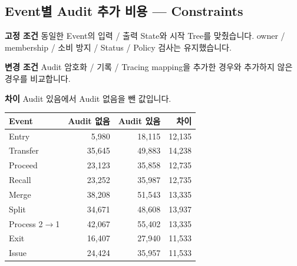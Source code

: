 \documentclass[11pt,a4paper]{article}
\begin{document}
\par\noindent\begin{minipage}{\linewidth}
\subsection*{Event별 Audit 추가 비용 — Constraints}
\textbf{고정 조건}\newline
동일한 Event의 입력 / 출력 State와 시작 Tree를 맞췄습니다.\newline
owner / membership / 소비 방지 / Status / Policy 검사는 유지했습니다.\par\smallskip
\textbf{변경 조건}\newline
Audit 암호화 / 기록 / Tracing mapping을 추가한 경우와 추가하지 않은 경우를 비교합니다.\par\smallskip
\textbf{차이}\newline
Audit 있음에서 Audit 없음을 뺀 값입니다.\par\smallskip
\begin{center}\small\begin{tabular}{@{}lrrr@{}}\toprule
\textbf{Event} & \textbf{Audit 없음} & \textbf{Audit 있음} & \textbf{차이} \\
\midrule
Entry & 5,980 & 18,115 & 12,135 \\
Transfer & 35,645 & 49,883 & 14,238 \\
Proceed & 23,123 & 35,858 & 12,735 \\
Recall & 23,252 & 35,987 & 12,735 \\
Merge & 38,208 & 51,543 & 13,335 \\
Split & 34,671 & 48,608 & 13,937 \\
Process 2$\rightarrow$1 & 42,067 & 55,402 & 13,335 \\
Exit & 16,407 & 27,940 & 11,533 \\
Issue & 24,424 & 35,957 & 11,533 \\
\bottomrule\end{tabular}\end{center}
\end{minipage}\par\medskip
\end{document}
